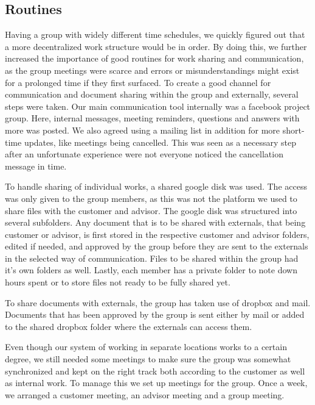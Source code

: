 \documentclass[11pt]{book}
\begin{document}
\subsection{Routines}
Having a group with widely different time schedules, we quickly figured out that a more decentralized work structure would be in order. By doing this, we further increased the importance of good routines for work sharing and communication, as the group meetings were scarce and errors or misunderstandings might exist for a prolonged time if they first surfaced.
To create a good channel for communication and document sharing within the group and externally, several steps were taken. Our main communication tool internally was a facebook project group. Here, internal messages, meeting reminders, questions and answers with more was posted. We also agreed using a mailing list in addition for more short-time updates, like meetings being cancelled. This was seen as a necessary step after an unfortunate experience were not everyone noticed the cancellation message in time.

To handle sharing of individual works, a shared google disk was used. The access was only given to the group members, as this was not the platform we used to share files with the customer and advisor. The google disk was structured into several subfolders. Any document that is to be shared with externals, that being customer or advisor, is first stored in the respective customer and advisor folders, edited if needed, and approved by the group before they are sent to the externals in the selected way of communication. Files to be shared within the group had it's own folders as well. Lastly, each member has a private folder to note down hours spent or to store files not ready to be fully shared yet.

To share documents with externals, the group has taken use of dropbox and mail. Documents that has been approved by the group is sent either by mail or added to the shared dropbox folder where the externals can access them.

Even though our system of working in separate locations works to a certain degree, we still needed some meetings to make sure the group was somewhat synchronized and kept on the right track both according to the customer as well as internal work.
To manage this we set up meetings for the group. Once a week, we arranged a customer meeting, an advisor meeting and a group meeting.
\end{document}
